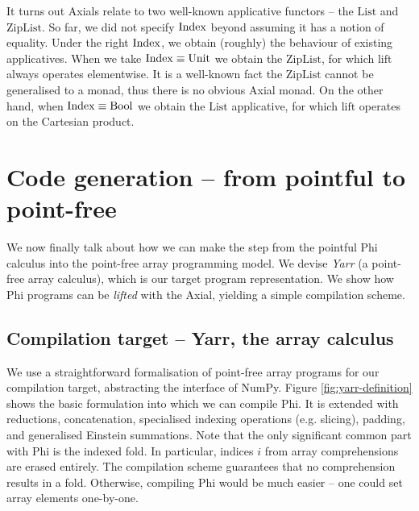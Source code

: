 It turns out Axials relate to two well-known applicative functors -- the $\mathrm{List}$ and $\mathrm{ZipList}$. 
So far, we did not specify $\mathrm{Index}$ beyond assuming it has a notion of equality. 
Under the right $\mathrm{Index}$, we obtain (roughly) the behaviour of existing applicatives.
When we take $\mathrm{Index} \equiv \mathrm{Unit}$ we obtain the $\mathrm{ZipList}$, for which $\mathrm{lift}$ always operates  elementwise.
It is a well-known fact the $\mathrm{ZipList}$ cannot be generalised to a monad, thus there is no obvious Axial monad.
On the other hand, when $\mathrm{Index} \equiv \mathrm{Bool}$ we obtain the $\mathrm{List}$ applicative, for which $\mathrm{lift}$ operates on the Cartesian product. 

\section{Code generation -- from pointful to point-free}
\label{codegen}

We now finally talk about how we can make the step from the pointful Phi calculus into the point-free array programming model. 
We devise \textit{Yarr} (a point-free array calculus), which is our target program representation. 
We show how Phi programs can be \textit{lifted} with the Axial, yielding a simple compilation scheme.

\subsection{Compilation target -- Yarr, the array calculus}
\label{yarr}

We use a straightforward formalisation of point-free array programs for our compilation target, abstracting the interface of NumPy.
Figure \ref{fig:yarr-definition} shows the basic formulation into which we can compile Phi. It is extended with reductions, concatenation, specialised indexing operations (e.g. slicing), padding, and generalised Einstein summations. Note that the only significant common part with Phi is the indexed fold. In particular, indices $i$ from array comprehensions are erased entirely. The compilation scheme guarantees that no comprehension results in a fold. Otherwise, compiling Phi would be much easier -- one could set array elements one-by-one.


